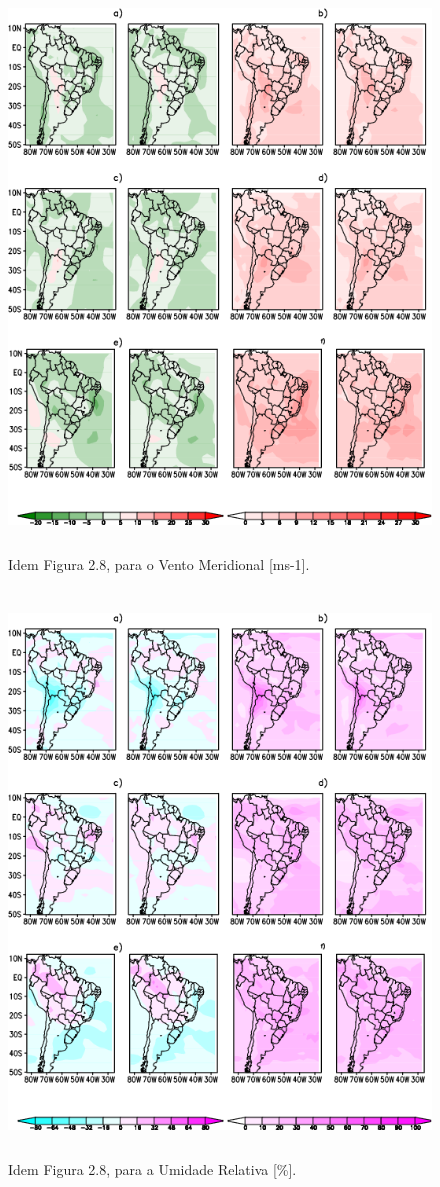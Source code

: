 \begin{figure}[!hbp]
\centering
\includegraphics[height=15cm]{./figs/campo_vies_eqm-vvel.png}
\caption{Idem Figura 2.8, para o Vento Meridional [ms-1].}
\label{fig51}
\end{figure}

\begin{figure}[!hbp]
\centering
\includegraphics[height=15cm]{./figs/campo_vies_eqm-umrl.png}
\caption{Idem Figura 2.8, para a Umidade Relativa [\%].}
\label{fig52}
\end{figure}


